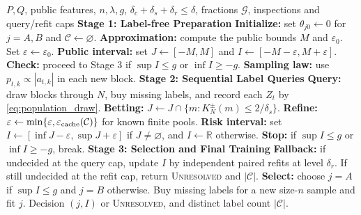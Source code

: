\begin{algorithm}[H]
\caption{Label-Efficient Comparison (LEC) for Population Risk}\label{alg:population}
\small
\renewcommand{\algorithmicrequire}{\textbf{Input:}}
\renewcommand{\algorithmicensure}{\textbf{Output:}}
\renewcommand{\algorithmiccomment}[1]{\hfill\textnormal{\# #1}}
\begin{algorithmic}[1]
\Require $P,Q$, public features, $n,\lambda,g$, $\delta_c+\delta_s+\delta_r\le\delta$, fractions $\mathcal G$, inspections and query/refit caps
\Statex\textbf{Stage 1: Label-free Preparation}
\State \textbf{Initialize:} set $\theta_{j0}\gets0$ for $j=A,B$ and $\mathcal C\gets\varnothing$.
\State \textbf{Approximation:} compute the public bounds $M$ and $\varepsilon_0$. Set $\varepsilon\gets\varepsilon_0$. 
\State \textbf{Public interval:} set $J\gets[-M,M]$ and $I\gets[-M-\varepsilon,M+\varepsilon]$.
\State \textbf{Check:} proceed to Stage 3 if $\sup I\le g$ or $\inf I\ge-g$.
\State \textbf{Sampling law:} use $p_{t,k}\propto|a_{t,k}|$ in each new block. 
\Statex\textbf{Stage 2: Sequential Label Queries}
 \State \textbf{Query:} draw blocks through $N$, buy missing labels, and record each $Z_t$ by \eqref{eq:population_draw}.
 \State \textbf{Betting:} $J\gets J\cap\{m:K_N^\pm(m)\le2/\delta_s\}$. 
 \State \textbf{Refine:} $\varepsilon\gets\min\{\varepsilon,\varepsilon_{\rm cache}(\mathcal C)\}$ for known finite pools. 
 \State \textbf{Risk interval:} set $I\gets[\inf J-\varepsilon,\sup J+\varepsilon]$ if $J\ne\varnothing$, and $I\gets\mathbb R$ otherwise.
 \State \textbf{Stop:} if $\sup I\le g$ or $\inf I\ge-g$, break.
\EndFor
\Statex\textbf{Stage 3: Selection and Final Training}
\State \textbf{Fallback:} if undecided at the query cap, update $I$ by independent paired refits at level $\delta_r$.
\State If still undecided at the refit cap, return \textsc{Unresolved} and $|\mathcal C|$.
\State \textbf{Select:} choose $j=A$ if $\sup I\le g$ and $j=B$ otherwise.
\State Buy missing labels for a new size-$n$ sample and fit $j$. 
\Ensure Decision $(j,I)$ or \textsc{Unresolved}, and distinct label count $|\mathcal C|$.
\end{algorithmic}
\end{algorithm}
